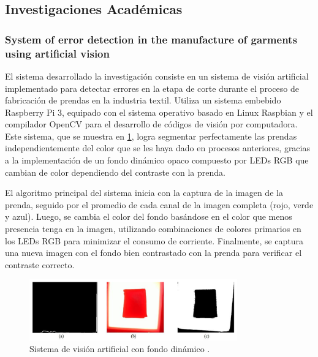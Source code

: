 
\subsection{Investigaciones Académicas}

\subsubsection{System of error detection in the manufacture of garments using artificial vision}

El sistema desarrollado la investigación \cite{Moreno2017} consiste en un sistema de visión artificial implementado para detectar errores en la etapa de corte durante el proceso de fabricación de prendas en la industria textil. Utiliza un sistema embebido Raspberry Pi 3, equipado con el sistema operativo basado en Linux Raspbian y el compilador OpenCV para el desarrollo de códigos de visión por computadora. Este sistema, que se muestra en \ref{fig:luz_sistema}, logra segmentar perfectamente las prendas independientemente del color que se les haya dado en procesos anteriores, gracias a la implementación de un fondo dinámico opaco compuesto por LEDs RGB que cambian de color dependiendo del contraste con la prenda.

El algoritmo principal del sistema inicia con la captura de la imagen de la prenda, seguido por el promedio de cada canal de la imagen completa (rojo, verde y azul). Luego, se cambia el color del fondo basándose en el color que menos presencia tenga en la imagen, utilizando combinaciones de colores primarios en los LEDs RGB para minimizar el consumo de corriente. Finalmente, se captura una nueva imagen con el fondo bien contrastado con la prenda para verificar el contraste correcto.

\begin{figure}[H]
	\centering
	\includegraphics[width=0.8\textwidth]{img/luz_sistema.png}
	\caption[Sistema de visión artificial con fondo dinámico.]{Sistema de visión artificial con fondo dinámico \cite{Moreno2017}.}
	\label{fig:luz_sistema}
\end{figure}

